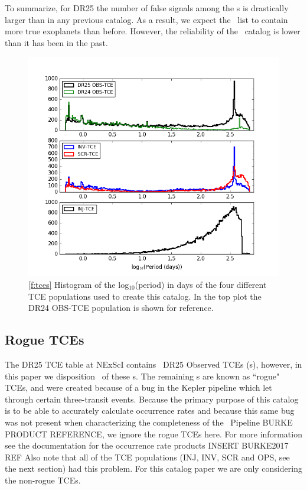 To summarize, for DR25 the number of false signals among the \opstce s  is drastically larger than in any previous catalog. As a result, we expect the \opstce\ list to contain more true exoplanets than before. However, the reliability of the \opstce\ catalog is lower than it has been in the past.   

\begin{figure}[h!]
 \begin{center}
  \includegraphics[width=1.1\linewidth]{fig-tcePeriods.png}
  \caption{\ref{f:tces} Histogram of the log$_{10}$(period) in days of the four different TCE populations used to create this catalog. In the top plot the DR24 OBS-TCE population is shown for reference.}
 \end{center}
 \end{figure}



\subsection{Rogue TCEs}
The DR25 TCE table at NExScI contains \ntces\ DR25 Observed TCEs (\opstce s), however, in this paper we disposition \ntcesnorogue\ of these \opstce s. The remaining \opstce s are known as ``rogue" TCEs, and were created because of a bug in the Kepler pipeline which let through certain three-transit events. Because the primary purpose of this catalog is to be able to accurately calculate occurrence rates and because this same bug was not present when characterizing the completeness of the \Kepler\ Pipeline \citep{}BURKE PRODUCT REFERENCE, we ignore the rogue TCEs here. For more information see the documentation for the occurrence rate products INSERT BURKE2017 REF%
Also note that all of the TCE populations (INJ, INV, SCR and OPS, see the next section) had this problem. For this catalog paper we are only considering the non-rogue TCEs.

